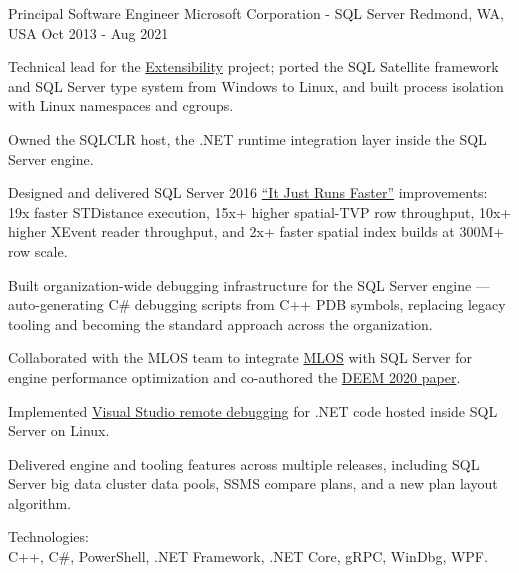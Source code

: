 \begin{cventries}
\cventry
{Principal Software Engineer} %
{Microsoft Corporation - SQL Server} %
{Redmond, WA, USA} %
{Oct 2013 - Aug 2021} %
{
  \begin{cvitems} %
    \item
    {
      Technical lead for the \href{https://docs.microsoft.com/en-us/sql/advanced-analytics/concepts/extensibility-framework}{Extensibility} project; ported the SQL Satellite framework and SQL Server type system from Windows to Linux, and built process isolation with Linux namespaces and cgroups.
    }
    \item
    {
      Owned the SQLCLR host, the .NET runtime integration layer inside the SQL Server engine.
    }
    \item
    {
      Designed and delivered SQL Server 2016 \href{https://learn.microsoft.com/en-gb/archive/blogs/psssql/sql-2016-it-just-runs-faster-announcement}{``It Just Runs Faster''} improvements: 19x faster STDistance execution, 15x+ higher spatial-TVP row throughput, 10x+ higher XEvent reader throughput, and 2x+ faster spatial index builds at 300M+ row scale.
    }
    \item
    {
      Built organization-wide debugging infrastructure for the SQL Server engine --- auto-generating {C\#} debugging scripts from C++ PDB symbols, replacing legacy tooling and becoming the standard approach across the organization.
    }
    \item
    {
      Collaborated with the MLOS team to integrate \href{https://github.com/microsoft/mlos}{MLOS} with SQL Server for engine performance optimization and co-authored the \href{https://arxiv.org/pdf/2006.02155.pdf}{DEEM 2020 paper}.
    }
    \item
    {
      Implemented \href{https://cloudblogs.microsoft.com/sqlserver/2016/12/16/sql-server-on-linux-how-introduction}{Visual Studio remote debugging} for .NET code hosted inside SQL Server on Linux.
    }
    \item
    {
      Delivered engine and tooling features across multiple releases, including SQL Server big data cluster data pools, SSMS compare plans, and a new plan layout algorithm.
    }
    \item
    {
      Technologies: \\
      C++, {C\#}, PowerShell, .NET Framework, .NET Core, gRPC, WinDbg, WPF. \\
    }
  \end{cvitems}
}

\end{cventries}

